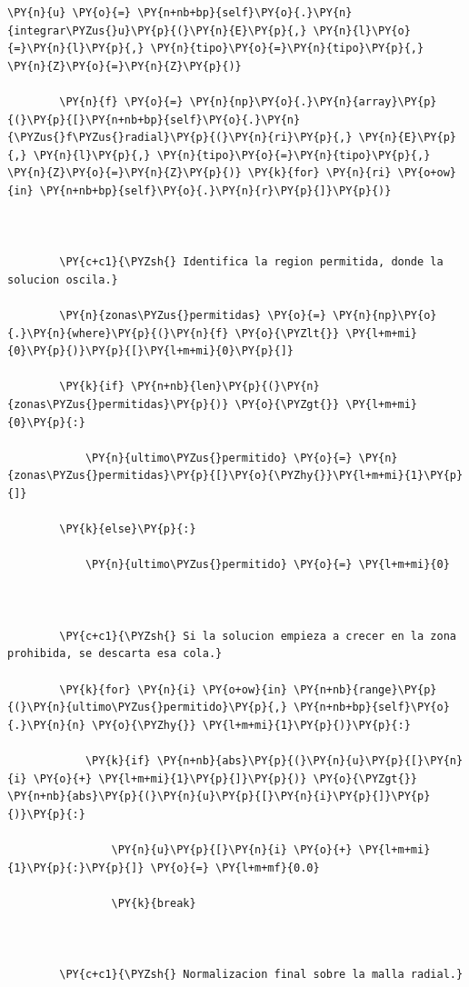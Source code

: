 \documentclass[11pt]{article}
\makeatletter
\def\PY@reset{\let\PY@it=\relax \let\PY@bf=\relax \let\PY@ul=\relax \let\PY@tc=\relax \let\PY@bc=\relax \let\PY@ff=\relax}
\def\PY@tok#1{\csname PY@tok@#1\endcsname}
\def\PY@toks#1+{\ifx\relax#1\empty\else \PY@tok{#1}\expandafter\PY@toks\fi}
\def\PY@do#1{\PY@bc{\PY@tc{\PY@ul{\PY@it{\PY@bf{\PY@ff{#1}}}}}}}
\def\PY#1#2{\PY@reset\PY@toks#1+\relax+\PY@do{#2}}
\makeatother
\begin{document}
\begin{tcolorbox}[breakable, size=fbox, boxrule=1pt, pad at break*=1mm,colback=cellbackground, colframe=cellborder]
\begin{Verbatim}[commandchars=\\\{\}]
        \PY{n}{u} \PY{o}{=} \PY{n+nb+bp}{self}\PY{o}{.}\PY{n}{integrar\PYZus{}u}\PY{p}{(}\PY{n}{E}\PY{p}{,} \PY{n}{l}\PY{o}{=}\PY{n}{l}\PY{p}{,} \PY{n}{tipo}\PY{o}{=}\PY{n}{tipo}\PY{p}{,} \PY{n}{Z}\PY{o}{=}\PY{n}{Z}\PY{p}{)}

        \PY{n}{f} \PY{o}{=} \PY{n}{np}\PY{o}{.}\PY{n}{array}\PY{p}{(}\PY{p}{[}\PY{n+nb+bp}{self}\PY{o}{.}\PY{n}{\PYZus{}f\PYZus{}radial}\PY{p}{(}\PY{n}{ri}\PY{p}{,} \PY{n}{E}\PY{p}{,} \PY{n}{l}\PY{p}{,} \PY{n}{tipo}\PY{o}{=}\PY{n}{tipo}\PY{p}{,} \PY{n}{Z}\PY{o}{=}\PY{n}{Z}\PY{p}{)} \PY{k}{for} \PY{n}{ri} \PY{o+ow}{in} \PY{n+nb+bp}{self}\PY{o}{.}\PY{n}{r}\PY{p}{]}\PY{p}{)}

        

        \PY{c+c1}{\PYZsh{} Identifica la region permitida, donde la solucion oscila.}

        \PY{n}{zonas\PYZus{}permitidas} \PY{o}{=} \PY{n}{np}\PY{o}{.}\PY{n}{where}\PY{p}{(}\PY{n}{f} \PY{o}{\PYZlt{}} \PY{l+m+mi}{0}\PY{p}{)}\PY{p}{[}\PY{l+m+mi}{0}\PY{p}{]}

        \PY{k}{if} \PY{n+nb}{len}\PY{p}{(}\PY{n}{zonas\PYZus{}permitidas}\PY{p}{)} \PY{o}{\PYZgt{}} \PY{l+m+mi}{0}\PY{p}{:}

            \PY{n}{ultimo\PYZus{}permitido} \PY{o}{=} \PY{n}{zonas\PYZus{}permitidas}\PY{p}{[}\PY{o}{\PYZhy{}}\PY{l+m+mi}{1}\PY{p}{]}

        \PY{k}{else}\PY{p}{:}

            \PY{n}{ultimo\PYZus{}permitido} \PY{o}{=} \PY{l+m+mi}{0}

            

        \PY{c+c1}{\PYZsh{} Si la solucion empieza a crecer en la zona prohibida, se descarta esa cola.}

        \PY{k}{for} \PY{n}{i} \PY{o+ow}{in} \PY{n+nb}{range}\PY{p}{(}\PY{n}{ultimo\PYZus{}permitido}\PY{p}{,} \PY{n+nb+bp}{self}\PY{o}{.}\PY{n}{n} \PY{o}{\PYZhy{}} \PY{l+m+mi}{1}\PY{p}{)}\PY{p}{:}

            \PY{k}{if} \PY{n+nb}{abs}\PY{p}{(}\PY{n}{u}\PY{p}{[}\PY{n}{i} \PY{o}{+} \PY{l+m+mi}{1}\PY{p}{]}\PY{p}{)} \PY{o}{\PYZgt{}} \PY{n+nb}{abs}\PY{p}{(}\PY{n}{u}\PY{p}{[}\PY{n}{i}\PY{p}{]}\PY{p}{)}\PY{p}{:}

                \PY{n}{u}\PY{p}{[}\PY{n}{i} \PY{o}{+} \PY{l+m+mi}{1}\PY{p}{:}\PY{p}{]} \PY{o}{=} \PY{l+m+mf}{0.0}

                \PY{k}{break}

        

        \PY{c+c1}{\PYZsh{} Normalizacion final sobre la malla radial.}


\end{Verbatim}
\end{tcolorbox}
\end{document}
